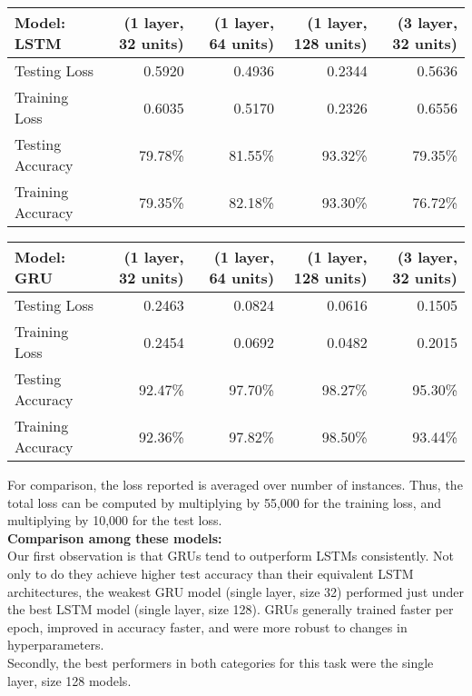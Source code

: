 \documentclass[paper=a4, fontsize=11pt]{scrartcl} %
\numberwithin{equation}{section} %
\numberwithin{figure}{section} %
\numberwithin{table}{section} %
\begin{document}
\begin{center}
\begin{tabular}{ |l|r|r|r|r| }
\hline
Model: LSTM & (1 layer, 32 units) & (1 layer, 64 units) & (1 layer, 128 units) & (3 layer, 32 units) \\
\hline
Testing Loss & 0.5920 & 0.4936 & 0.2344 & 0.5636 \\
Training Loss & 0.6035 & 0.5170 & 0.2326 & 0.6556 \\
\hline
Testing Accuracy & 79.78\% & 81.55\% & 93.32\% & 79.35\% \\
Training Accuracy & 79.35\% & 82.18\% & 93.30\% & 76.72\% \\
\hline
\end{tabular}
\end{center}

\begin{center}
\begin{tabular}{ |l|r|r|r|r| }
\hline
Model: GRU & (1 layer, 32 units) & (1 layer, 64 units) & (1 layer, 128 units) & (3 layer, 32 units) \\
\hline
Testing Loss & 0.2463 & 0.0824 & 0.0616 & 0.1505 \\
Training Loss &  0.2454 & 0.0692 & 0.0482 & 0.2015 \\
\hline
Testing Accuracy & 92.47\% & 97.70\% & 98.27\% & 95.30\% \\
Training Accuracy & 92.36\% & 97.82\% & 98.50\% & 93.44\% \\
\hline
\end{tabular}
\end{center}


For comparison, the loss reported is averaged over number of instances. Thus, the total loss can be computed by multiplying by 55,000 for the training loss, and multiplying by 10,000 for the test loss.\\

\textbf{Comparison among these models:} \\
Our first observation is that GRUs tend to outperform LSTMs consistently. Not only to do they achieve higher test accuracy than their equivalent LSTM architectures, the weakest GRU model (single layer, size 32) performed just under the best LSTM model (single layer, size 128). GRUs generally trained faster per epoch, improved in accuracy faster, and were more robust to changes in hyperparameters.\\

Secondly, the best performers in both categories for this task were the single layer, size 128 models.\\
\end{document}
